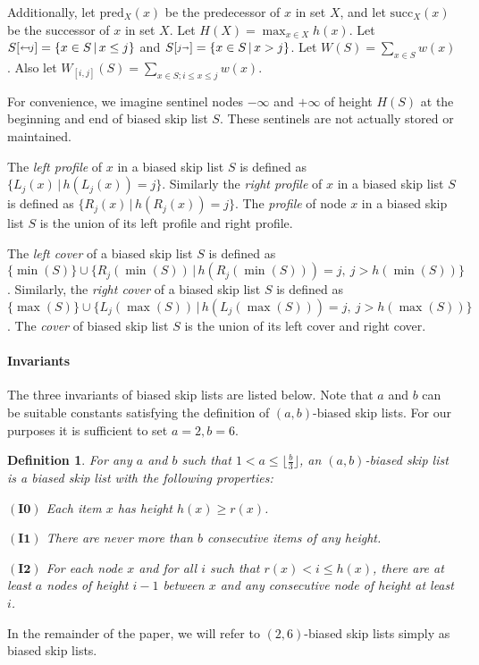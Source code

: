 \documentclass[11pt]{article}
\newcommand{\invzero}{\ensuremath{\mathbf{(I0)}}}
\newcommand{\invone}{\ensuremath{\mathbf{(I1)}}}
\newcommand{\invtwo}{\ensuremath{\mathbf{(I2)}}}
\newcommand{\nodeheight}[1]{\ensuremath{h(#1)}}
\newcommand{\intheight}[1]{\ensuremath{H(#1)}}
\newcommand{\intmax}[1]{\ensuremath{\max(\intl #1)}}
\newcommand{\intmin}[1]{\ensuremath{\min(\intl #1)}}
\newcommand{\intl}[1]{\ensuremath{#1}}
\newcommand{\intweight}[1]{{\ensuremath{W(\intl #1)}}}
\newcommand{\interweight}[3]{{\ensuremath{W_{[#2,#3]}(#1)}}}
\newcommand{\nodeweight}[1]{{\ensuremath{w(\node #1)}}}
\newcommand{\noderank}[1]{\ensuremath{r(\node #1)}}
\newcommand{\node}[1]{\ensuremath{#1}}
\newcommand{\set}[1]{\ensuremath{#1}}
\newcommand{\prebsltempl}[4]{\ensuremath{#1{[\raisebox{#4}{$#3\mapsfrom\hspace{-0.0mm}#2$}]}}}
\newcommand{\prebsl}[2]{\ensuremath{\prebsltempl{#1}{#2}{\scriptstyle}{0.3mm}}}
\newcommand{\postbsltempl}[4]{\ensuremath{#1{[\raisebox{#4}{$#3#2\shortrightarrow\hspace{-0.0mm}$}]}}}
\newcommand{\postbsl}[2]{\ensuremath{\postbsltempl{#1}{#2}{\scriptstyle}{0.3mm}}}
\newcommand{\bsl}[1]{\ensuremath{#1}}
\newcommand{\pre}[2]{\text{pred}\ensuremath{_{#1}(#2)}}
\newcommand{\suc}[2]{\text{succ}\ensuremath{_{#1}(#2)}}
\newcommand{\lvlpre}[2]{\ensuremath{L_{#1}(#2)}}
\newcommand{\lvlsuc}[2]{\ensuremath{R_{#1}(#2)}}
\newcounter{count}
\newtheorem{defn}[count]{Definition}
\begin{document}
 
Additionally, let $\pre{X}{x}$ be the predecessor of $x$ in set \set X, and let $\suc{X}{x}$ be the successor of $x$ in set \set $X$. Let $\intheight X = \max_{x\in X} \nodeheight x$. Let $\prebsl{S}{j} = \{\node x\in \bsl S\,|\,x\leq j\}$ and $\postbsl{S}{j} = \{\node x\in \bsl S\,|\,x> j\}$. Let $\intweight S= \sum_{\node x\in \set S} \nodeweight x$. Also let $\interweight{S}{i}{j}= \sum_{\node x \in \set S; i\leq \node x \leq j} \nodeweight x$.

For convenience, we imagine sentinel nodes $-\infty$ and $+\infty$ of height \intheight S at the beginning and end of biased skip list \bsl S. These sentinels are not actually stored or maintained. 

 The \textit{left profile} of \node x in a biased skip list \bsl S is defined as $\{\lvlpre{j}{x}\,|\,\nodeheight{\lvlpre{j}{x}} = j\}$. Similarly the \textit{right profile} of \node x in a biased skip list \bsl S is defined as $\{\lvlsuc{j}{x}\,|\,\nodeheight{\lvlsuc{j}{x}} = j\}$. The \textit{profile} of node $x$ in a biased skip list \bsl S is the union of its left profile and right profile. 

 The \textit{left cover} of a biased skip list \bsl S is defined as $\{\intmin{S}\}\cup \{\lvlsuc{j}{\intmin{S}}\,|\,\nodeheight{\lvlsuc{j}{\intmin{S}}} = j,\ j>\nodeheight{\intmin{S}} \}$. 
Similarly, the \textit{right cover} of a biased skip list \bsl S is defined as $\{\intmax{S}\}\cup \{\lvlpre{j}{\intmax{S}}\,|\,\nodeheight{\lvlpre{j}{\intmax{S}}} = j,\ j>\nodeheight{\intmax{S}} \}$. 
The \textit{cover} of biased skip list \bsl S is the union of its left cover and right cover. 
 

\paragraph{Invariants} 
The three invariants of biased skip lists are listed below. Note that $a$ and $b$ can be suitable constants satisfying the definition of $(a,b)$-biased skip lists. For our purposes it is sufficient to set $a=2, b=6$. 
\begin{defn} 
For any $a$ and $b$ such that $1<a\leq \lfloor\frac{b}{3}\rfloor$, an $(a,b)$-biased skip list is a biased skip list with the following properties: 
\begin{description} 
\item {\invzero} Each item $x$ has height $\nodeheight x\geq \noderank x$. 
\item {\invone} There are never more than $b$ consecutive items of any height. 
\item {\invtwo} For each node $x$ and for all $i$ such that $\noderank x < i \leq \nodeheight x$, there are at least $a$ nodes of height $i-1$ between $x$ and any consecutive node of height at least $i$. 
\end{description} 
\end{defn} 
\noindent In the remainder of the paper, we will refer to $(2,6)$-biased skip lists simply as biased skip lists. 
\end{document}
